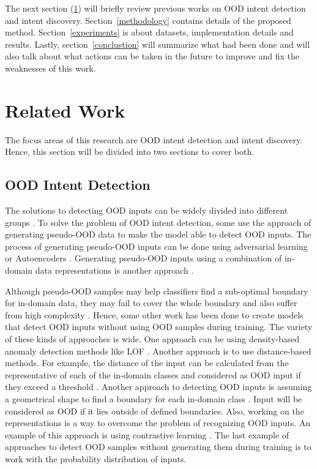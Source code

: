 \documentclass{article}
\begin{document}
The next section (\ref{relatedworks}) will briefly review previous works on OOD intent detection and intent discovery.
Section~\ref{methodology} contains details of the proposed method.
Section~\ref{experiments} is about datasets, implementation details and results.
Lastly, section~\ref{conclustion} will summarize what had been done and
will also talk about what actions can be taken in the future
to improve and fix the weaknesses of this work.

\section{Related Work}\label{relatedworks}
\noindent The focus areas of this research are OOD intent detection and intent discovery.
Hence, this section will be divided into two sections to cover both.

\subsection{OOD Intent Detection}\label{ood}

\noindent The solutions to detecting OOD inputs can be widely divided into different groups \citep{gen2021}. 
To solve the problem of OOD intent detection, 
some use the approach of generating pseudo-OOD data to make the model able to detect OOD inputs. 
The process of generating pseudo-OOD inputs can be done using adversarial learning or Autoencoders \citep{10.1145/3477314.3507089,marek2021oodgan,zheng2020out,ryu2018out}. 
Generating pseudo-OOD inputs using a combination of in-domain data representations is another approach \citep{zhan-etal-2021-scope}. 

Although pseudo-OOD samples may help classifiers find a sub-optimal boundary for in-domain data, 
they may fail to cover the whole boundary and also suffer from high complexity \citep{vernekar2019out}. 
Hence, some other work has been done to create models that detect OOD inputs without using OOD samples during training. 
The variety of these kinds of approaches is wide.
One approach can be using density-based anomaly detection methods like LOF \citep{yan2020unknown,lin-xu-2019-deep}. 
Another approach is to use distance-based methods. 
For example, the distance of the input can be calculated from the representative of each of the in-domain classes and considered as OOD input if they exceed a threshold \citep{podolskiy2021revisiting}.
Another approach to detecting OOD inputs is assuming a geometrical shape to find a boundary for each in-domain class \citep{zhang2021deep}. 
Input will be considered as OOD if it lies outside of defined boundaries.
Also, working on the representations is a way to overcome the problem of recognizing OOD inputs. 
An example of this approach is using contrastive learning \citep{jin2022towards}.
The last example of approaches to detect OOD samples without generating them during training is to work with the probability distribution of inputs\citep{10.1145/3397271.3401318}.
\end{document}

